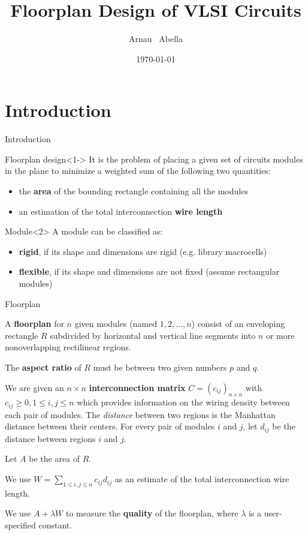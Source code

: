 \documentclass[xcolor=pdftex,dvipsnames,table]{beamer}
\title{Floorplan Design of VLSI Circuits}
\author[A. Abella]{Arnau ~Abella\inst{1}}
\institute[UPC]
{
  \inst{1}%
  Universitat Polit\`ecnica de Barcelona
}
\date{\today}
\begin{document}
\frame{\titlepage}

\section{Introduction}
\begin{frame}{Introduction}
  \begin{block}{Floorplan design}<1->
    It is the problem of placing a given set of circuits modules in the plane to minimize
    a weighted sum of the following two quantities:
    \begin{itemize}
      \item the \textbf{area} of the bounding rectangle containing all the modules
      \item an estimation of the total interconnection \textbf{wire length}
    \end{itemize}
  \end{block}
  \begin{block}{Module}<2>
    A module can be classified as:
    \begin{itemize}
      \item \textbf{rigid}, if its shape and dimensions are rigid (e.g. library macrocells)
      \item \textbf{flexible}, if its shape and dimensions are not fixed (assume rectangular modules)
    \end{itemize}
  \end{block}
\end{frame}

\begin{frame}[allowframebreaks]{Floorplan}
  \begin{block}{}
    A \textbf{floorplan} for $n$ given modules (named $1,2,\ldots,n$) consist of an enveloping rectangle $R$
    subdivided by horizontal and vertical line segments into $n$ or more nonoverlapping rectilinear regions.
  \end{block}
  \begin{block}{}
    The \textbf{aspect ratio} of $R$ must be between two given numbers $p$ and $q$.
  \end{block}
  \begin{block}{}
    We are given an $n \times n$ \textbf{interconnection matrix } $C = (c_{ij})_{n \times n}$ with $c_{ij} \geq 0, 1 \leq i,j \leq n$ which provides information on the wiring density between each pair of modules. The \textit{distance} between two regions is the Manhattan distance between their centers. For every pair of modules $i$ and $j$, let $d_{ij}$ be the distance between regions $i$ and $j$.
  \end{block}
  \begin{block}{}
    Let $A$ be the area of $R$.
    \newline

    We use $W = \sum_{1 \leq i,j \leq n} c_{ij}d_{ij}$ as an estimate of the total interconnection wire length.
    \newline

    We use $A + \lambda W$ to measure the \textbf{quality} of the floorplan, where $\lambda$ is a user-specified constant.
  \end{block}
\end{frame}
\end{document}
